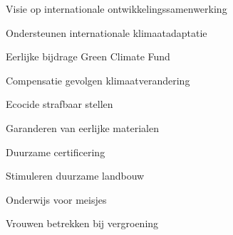 
\begin{visie-concept}{Visie op internationale ontwikkelingssamenwerking}\end{visie-concept}

\begin{voorstel-concept}{Ondersteunen internationale klimaatadaptatie}\end{voorstel-concept}
\begin{voorstel-concept}{Eerlijke bijdrage Green Climate Fund}\end{voorstel-concept}
\begin{voorstel-concept}{Compensatie gevolgen klimaatverandering}\end{voorstel-concept}
\begin{voorstel-concept}{Ecocide strafbaar stellen}\end{voorstel-concept}
\begin{voorstel-concept}{Garanderen van eerlijke materialen}\end{voorstel-concept}
\begin{voorstel-concept}{Duurzame certificering}\end{voorstel-concept}
\begin{voorstel-concept}{Stimuleren duurzame landbouw}\end{voorstel-concept}
\begin{voorstel-concept}{Onderwijs voor meisjes}\end{voorstel-concept}
\begin{voorstel-concept}{Vrouwen betrekken bij vergroening}\end{voorstel-concept}
